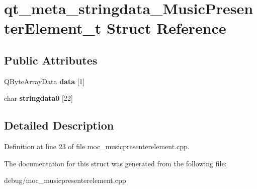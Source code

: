 \hypertarget{structqt__meta__stringdata___music_presenter_element__t}{}\section{qt\+\_\+meta\+\_\+stringdata\+\_\+\+Music\+Presenter\+Element\+\_\+t Struct Reference}
\label{structqt__meta__stringdata___music_presenter_element__t}
\subsection*{Public Attributes}
\begin{DoxyCompactItemize}
\item 
\mbox{\label{structqt__meta__stringdata___music_presenter_element__t_a9c2c1cdf376f391fafdb126fb9c656d5}} 
Q\+Byte\+Array\+Data {\bfseries data} \mbox{[}1\mbox{]}
\item 
\mbox{\label{structqt__meta__stringdata___music_presenter_element__t_a0cb550b2d9807f4d3971bb81dcffefaf}} 
char {\bfseries stringdata0} \mbox{[}22\mbox{]}
\end{DoxyCompactItemize}


\subsection{Detailed Description}


Definition at line 23 of file moc\+\_\+musicpresenterelement.\+cpp.



The documentation for this struct was generated from the following file\+:\begin{DoxyCompactItemize}
\item 
debug/moc\+\_\+musicpresenterelement.\+cpp\end{DoxyCompactItemize}
